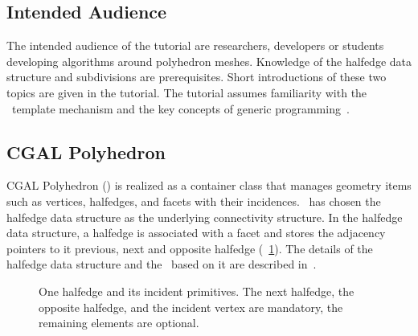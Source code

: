 \documentclass[twocolumn]{article}
\begin{document}
\subsection*{Intended Audience}

The intended audience of the tutorial are researchers, developers or
students developing algorithms around polyhedron meshes. Knowledge of 
the halfedge data structure and subdivisions are prerequisites. 
Short introductions of these two topics are given in the tutorial.
The tutorial assumes familiarity with the \CC\ template mechanism 
and the key concepts of generic programming~\cite{Austern:1999:GPS}. 


\subsection*{CGAL Polyhedron}

CGAL Polyhedron (\cgalpoly) is realized as a container class 
that manages geometry items such as vertices, halfedges, and 
facets with their incidences.  \cgalpoly\ has chosen the 
halfedge data structure as the underlying connectivity 
structure. In the halfedge data structure, a halfedge is 
associated with a facet and stores the adjacency pointers 
to it previous, next and opposite halfedge (\figurename\ \ref{fig:halfedge}). 
The details of the halfedge data structure and the \cgalpoly\ based 
on it are described in~\cite{k-ugpdd-99}.

\begin{figure}[h]
    \caption{One halfedge and its incident primitives. The next
      halfedge, the opposite halfedge, and the incident vertex are
      mandatory, the remaining elements are optional.
    }
    \label{fig:halfedge}
\end{figure}
\end{document}
